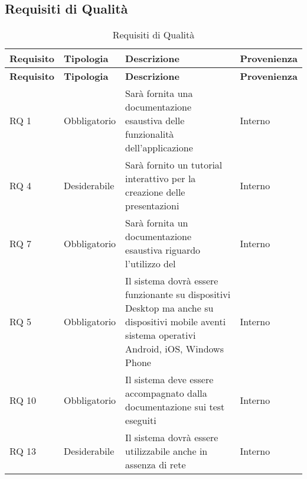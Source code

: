 \subsection{Requisiti di Qualità}{
		\renewcommand*{\arraystretch}{1.4}
		\begin{longtable} [c]{| p{2.5cm} | p{2.5cm} | p{6cm} |p{2.5cm}|}
			\caption{Requisiti di Qualità \label{tab:reqQualita}}\\
			 \hline
			 \textbf{Requisito} & \textbf{Tipologia} & \textbf{Descrizione} & \textbf{Provenienza} \\
			 \hline
			 \endfirsthead
			 \hline
			 \textbf{Requisito} & \textbf{Tipologia} & \textbf{Descrizione} & \textbf{Provenienza} \\
			 \hline
				\endhead
			 \hline
			 \endfoot
			 \hline
			 \endlastfoot
			RQ 1 & Obbligatorio & Sarà fornita una documentazione esaustiva delle funzionalità dell'applicazione & Interno\\
			\hline
			RQ 4 & Desiderabile & Sarà fornito un tutorial interattivo per la creazione delle presentazioni & Interno\\
			\hline
			RQ 7 & Obbligatorio & Sarà fornita un documentazione esaustiva riguardo l'utilizzo del & Interno\\
			\hline
			RQ 5 & Obbligatorio & Il sistema dovrà essere funzionante su dispositivi Desktop ma anche su dispositivi mobile aventi sistema operativi Android, iOS, Windows Phone & Interno\\
			\hline
			RQ 10 & Obbligatorio & Il sistema deve essere accompagnato dalla documentazione sui test eseguiti & Interno\\
			\hline
			RQ 13 & Desiderabile & Il sistema dovrà essere utilizzabile anche in assenza di rete & Interno\\			
		\end{longtable}
	}